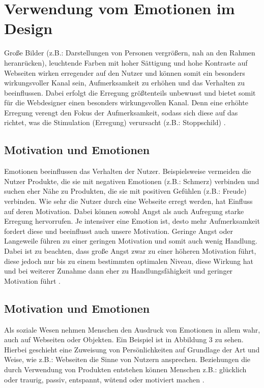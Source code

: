 \documentclass[./dokumentation.tex]{subfiles}
\begin{document}
\chapter{Verwendung vom Emotionen im Design}
Große Bilder (z.B.: Darstellungen von Personen vergrößern, nah an den Rahmen heranrücken), leuchtende Farben mit hoher Sättigung und hohe Kontraste auf Webseiten wirken erregender auf den Nutzer und können somit ein besonders wirkungsvoller Kanal sein, Aufmerksamkeit zu erhöhen und das Verhalten zu beeinflussen. Dabei erfolgt die Erregung größtenteils unbewusst und bietet somit für die Webdesigner einen besonders wirkungsvollen Kanal. Denn eine erhöhte Erregung verengt den Fokus der Aufmerksamkeit, sodass sich diese auf das richtet,  was die Stimulation (Erregung) verursacht (z.B.: Stoppschild) \cite{vanGorp2013}. 

\section{Motivation und Emotionen}
Emotionen beeinflussen das Verhalten der Nutzer. Beispielsweise vermeiden die Nutzer Produkte, die sie mit negativen Emotionen (z.B.: Schmerz) verbinden und suchen eher Nähe zu Produkten, die sie mit positiven Gefühlen (z.B.: Freude) verbinden. Wie sehr die Nutzer durch eine Webseite erregt werden, hat Einfluss auf deren Motivation. Dabei können sowohl Angst als auch Aufregung starke Erregung hervorrufen. Je intensiver eine Emotion ist, desto mehr Aufmerksamkeit fordert diese und beeinflusst auch unsere Motivation. Geringe Angst oder Langeweile führen zu einer geringen Motivation und somit auch wenig Handlung. Dabei ist zu beachten, dass große Angst zwar zu einer höheren Motivation führt, diese jedoch nur bis zu einem bestimmten optimalen Niveau, diese Wirkung hat und bei weiterer Zunahme dann eher zu Handlungsfähigkeit und geringer Motivation führt \cite{vanGorp2013}.

\section{Motivation und Emotionen}
Als soziale Wesen nehmen Menschen den Ausdruck von Emotionen in allem wahr, auch auf Webseiten oder Objekten. Ein Beispiel ist in Abbildung 3 zu sehen. Hierbei geschieht eine Zuweisung von Persönlichkeiten auf Grundlage der Art und Weise, wie z.B.: Webseiten die Sinne von Nutzern ansprechen. Beziehungen die durch Verwendung von Produkten entstehen können Menschen z.B.: glücklich oder traurig, passiv, entspannt, wütend oder motiviert machen \cite{vanGorp2013}. \\
\end{document}
